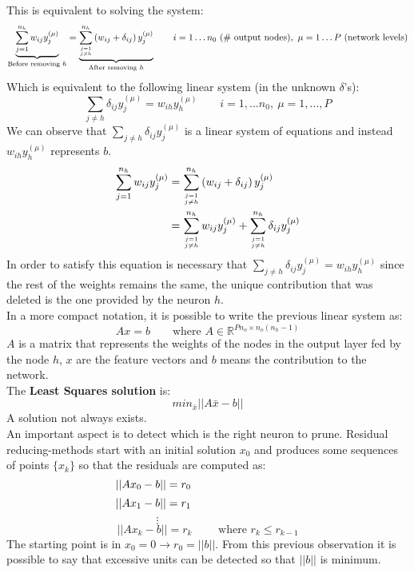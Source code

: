 This is equivalent to solving the system:
$$\underbrace{\sum_{j=1}^{n_{h}} w_{ij} y_{j}^{(\mu)}}_{\text{Before removing }h} = \underbrace{\sum_{j=1 \atop j\neq h}^{n_{h}} \left( w_{ij} + \delta_{ij} \right) y_{j}^{ (\mu)}}_{\text{After removing }h} \qquad i=1 \dots n_0 \text{ (\# output nodes)},~\mu=1 \dots P \text{ (network levels)}$$
Which is equivalent to the following linear system (in the unknown $\delta$'s):
$$\sum_{j \neq h} \delta_{ij} y_{j}^{(\mu)} = w_{ih} y_{h}^{(\mu)} \qquad i=1, \dots n_0, ~ \mu=1,\dots, P$$
We can observe that $\sum_{j \neq h} \delta_{ij} y_{j}^{(\mu)}$ is a linear system of equations and instead $w_{ih} y_{h}^{(\mu)}$ represents $b$.
\begin{equation*}
\begin{split}
\sum_{j=1}^{n_{h}} w_{ij} y_{j}^{(\mu)} &= \sum_{j=1 \atop j\neq h}^{n_{h}} \left( w_{ij} + \delta_{ij} \right) y_{j}^{ (\mu)} \\
& = \sum_{j=1 \atop j\neq h}^{n_{h}} w_{ij}y_{j}^{ (\mu)} + \sum_{j=1 \atop j\neq h}^{n_{h}}\delta_{ij}  y_{j}^{ (\mu)}
\end{split}
\end{equation*}
In order to satisfy this equation is necessary that $\sum_{j \neq h} \delta_{ij} y_{j}^{(\mu)} = w_{ih} y_{h}^{(\mu)}$ since the rest of the weights remains the same, the unique contribution that was deleted is the one provided by the neuron $h$.\\

In a more compact notation, it is possible to write the previous linear system as:
$$Ax = b \qquad \text{where } A \in \mathbb { R } ^ { P n _ { o } \times n _ { o } \left( n _ { h } - 1 \right) }$$
$A$ is a matrix that represents the weights of the nodes in the output layer fed by the node $h$, $x$ are the feature vectors and $b$ means the contribution to the network.\\
The \textbf{Least Squares solution} is:
$$min_{\bar{x}} \vert \vert A \bar{x} - b \vert \vert$$
A solution not always exists.\\
An important aspect is to detect which is the right neuron to prune. Residual reducing-methods start with an initial solution $x_0$ and produces some sequences of points $\{x_k\}$ so that the residuals are computed as:
$$\vert \vert Ax_0 - b \vert \vert  = r_0 \hspace{9.7em} $$
$$\vert \vert Ax_1 - b \vert \vert  = r_1 \hspace{9.7em}$$
$$\vdots \hspace{9em}$$
$$\vert\vert Ax_k - b \vert \vert = r_k \qquad \text{ where } r_k \leq r_{k-1}$$
The starting point is in $x_0 = 0 \rightarrow r_0=||b||$.
From this previous observation it is possible to say that excessive units can be detected so that $|| b ||$ is minimum.\\

